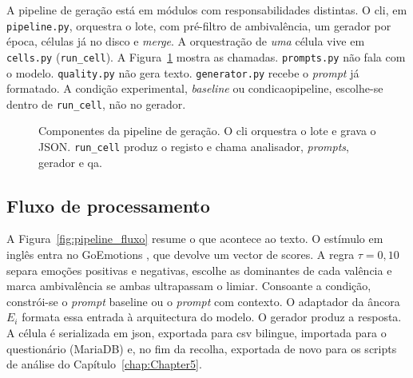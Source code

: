 A pipeline de geração está em módulos com responsabilidades distintas. O \gls{cli}, em \texttt{pipeline.py}, orquestra o lote, com pré-filtro de ambivalência, um gerador por época, células já no disco e \textit{merge}. A orquestração de \textit{uma} célula vive em \texttt{cells.py} (\texttt{run\_cell}). A Figura~\ref{fig:pipeline_componentes} mostra as chamadas. \texttt{prompts.py} não fala com o modelo. \texttt{quality.py} não gera texto. \texttt{generator.py} recebe o \textit{prompt} já formatado. A condição experimental, \textit{baseline} ou \gls{condicaopipeline}, escolhe-se dentro de \texttt{run\_cell}, não no gerador.

\begin{figure}[ht]
\centering
{}
\caption[Componentes da pipeline de geração.]{Componentes da pipeline de geração. O \acrshort{cli} orquestra o lote e grava o JSON. \texttt{run\_cell} produz o registo e chama analisador, \textit{prompts}, gerador e \acrshort{qa}.}
\label{fig:pipeline_componentes}
\end{figure}

\subsection{Fluxo de processamento}
\label{subsec:impl_fluxo}

A Figura~\ref{fig:pipeline_fluxo} resume o que acontece ao texto. O estímulo em inglês entra no GoEmotions \parencite{Demszky2020GoEmotions}, que devolve um vector de scores. A regra \(\tau = 0{,}10\) separa emoções positivas e negativas, escolhe as dominantes de cada valência e marca ambivalência se ambas ultrapassam o limiar. Consoante a condição, constrói-se o \textit{prompt} baseline ou o \textit{prompt} com contexto. O adaptador da âncora \(E_i\) formata essa entrada à arquitectura do modelo. O gerador produz a resposta. A célula é serializada em \gls{json}, exportada para \gls{csv} bilingue, importada para o questionário (MariaDB) e, no fim da recolha, exportada de novo para os scripts de análise do Capítulo~\ref{chap:Chapter5}.

